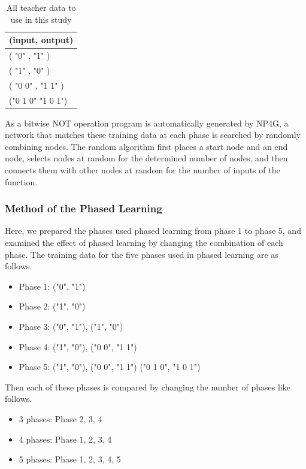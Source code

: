 \documentclass{article}
\begin{document}
\begin{table}[htbp]
\centering
\caption {All teacher data to use in this study}
\label{tbl:TeacherData}
\begin{tabular}{l}
\hline
(input, output) \\
\hline \hline
( "0" , "1" ) \\
( "1" , "0" ) \\
( "0 0" , "1 1" ) \\
("0 1 0" "1 0 1") \\
\hline
\end{tabular}
\end{table}

As a bitwise NOT operation program is automatically generated by NP4G, a network that matches these training data at each phase is searched by randomly combining nodes.
The random algorithm first places a start node and an end node, selects nodes at random for the determined number of nodes, and then connects them with other nodes at random for the number of inputs of the function.

\subsubsection {Method of the Phased Learning}
\label{sec:PLhow}
Here, we prepared the phases used phased learning from phase 1 to phase 5, and examined the effect of phased learning by changing the combination of each phase.
The training data for the five phases used in phased learning are as follows.

\begin{itemize}
\item Phase 1: ("0", "1")
\item Phase 2: ("1", "0")
\item Phase 3: ("0", "1"), ("1", "0")
\item Phase 4: ("1", "0"), ("0 0", "1 1")
\item Phase 5: ("1", "0"), ("0 0", "1 1") ("0 1 0", "1 0 1")
\end{itemize}

Then each of these phases is compared by changing the number of phases like follows.
\begin{itemize}
\item 3 phases:
Phase 2, 3, 4
\item 4 phases:
Phase 1, 2, 3, 4
\item 5 phases:
Phase 1, 2, 3, 4, 5
\end{itemize}
\noindent
\end{document}
